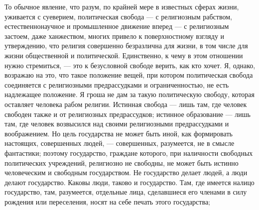 \documentclass[12pt]{article}
\begin{document}
То обычное явление, что разум, по крайней мере в известных сферах жизни, уживается с суеверием, политическая свобода --- с религиозным рабством, естественнонаучное и промышленное движение вперед --- с религиозным застоем, даже ханжеством, многих привело к поверхностному взгляду и утверждению, что религия совершенно безразлична для жизни, в том числе для жизни общественной и политической. Единственно, к чему в этом отношении нужно стремиться, --- это к безусловной свободе верить, как кто хочет. Я, однако, возражаю на это, что такое положение вещей, при котором политическая свобода соединяется с религиозными предрассудками и ограниченностью, не есть надлежащее положение. Я гроша не дам за такую политическую свободу, которая оставляет человека рабом религии. Истинная свобода --- лишь там, где человек свободен также и от религиозных предрассудков; истинное образование --- лишь там, где человек возвысился над своими религиозными предрассудками и воображением. Но цель государства не может быть иной, как формировать настоящих, совершенных людей, --- совершенных, разумеется, не в смысле фантастики; поэтому государство, граждане которого, при наличности свободных политических учреждений, религиозно не свободны, не может быть истинно человеческим и свободным государством. Не государство делает людей, а люди делают государство. Каковы люди, таково и государство. Там, где имеется налицо государство, там, разумеется, отдельные лица, сделавшиеся его членами в силу рождения или переселения, носят на себе печать этого государства; 
\end{document}
